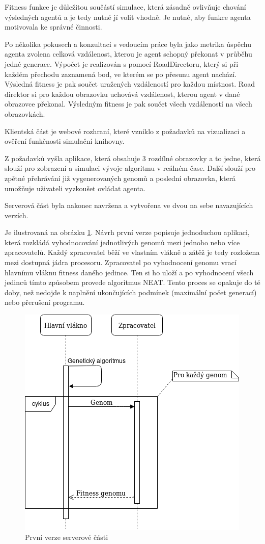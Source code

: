 Fitness funkce je důležitou součástí simulace, která zásadně ovlivňuje chování výsledných agentů a je tedy nutné jí volit vhodně. Je nutné, aby funkce agenta motivovala ke správné činnosti.

Po několika pokusech a konzultaci s vedoucím práce byla jako metrika úspěchu agenta zvolena celková vzdálenost, kterou je agent schopný překonat v průběhu jedné generace. Výpočet je realizován s pomocí RoadDirectoru, který si při každém přechodu zaznamená bod, ve kterém se po přesunu agent nachází. Výsledná fitness je pak součet uražených vzdáleností pro každou místnost. Road direktor si pro každou obrazovku uchovává vzdálenost, kterou agent v dané obrazovce překonal. Výsledným fitness je pak součet všech vzdáleností na všech obrazovkách.

Klientská část je webové rozhraní, které vzniklo z požadavků na vizualizaci a ověření funkčnosti simulační knihovny. 

Z požadavků vyšla aplikace, která obsahuje 3 rozdílné obrazovky a to jedne, která slouží pro zobrazení a simulaci vývoje algoritmu v reálném čase. Další slouží pro zpětné přehrávání již vygenerovaných genomů a poslední obrazovka, která umožňuje uživateli vyzkoušet ovládat agenta.

Serverová část byla nakonec navržena a vytvořena ve dvou na sebe navazujících verzích. 

Je ilustrovaná na obrázku \ref{fig:server_first}. Návrh první verze popisuje jednoduchou aplikaci, která rozkládá vyhodnocování jednotlivých genomů mezi jednoho nebo více zpracovatelů. Každý zpracovatel běží ve vlastním vlákně a zátěž je tedy rozložena mezi dostupná jádra procesoru. Zpracovatel po vyhodnocení genomu vrací hlavnímu vláknu fitness daného jedince. Ten si ho uloží a po vyhodnocení všech jedinců tímto způsobem provede algoritmus NEAT. Tento proces se opakuje do té doby, než nedojde k naplnění ukončujících podmínek (maximální počet generací) nebo přerušení programu.

\begin{figure}[H]
	\centering
	\includegraphics[width=0.7\linewidth]{server_first_use_case}
	\caption{První verze serverové části}
	\label{fig:server_first}
\end{figure}

